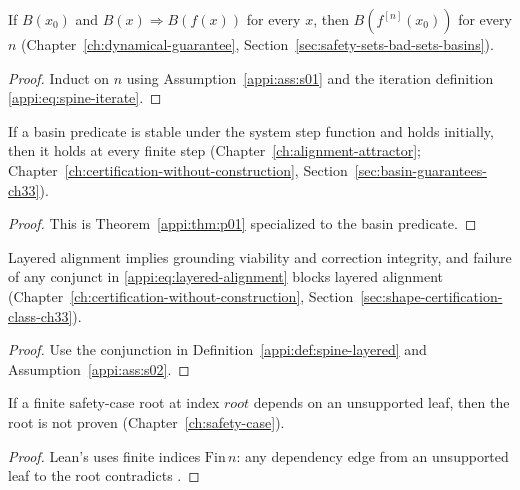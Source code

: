 \begin{theorem}
\label{appi:thm:p01}
If \(B(x_0)\) and \(B(x)\Rightarrow B(f(x))\) for every \(x\), then \(B(f^{[n]}(x_0))\) for every \(n\) (Chapter~\ref{ch:dynamical-guarantee}, Section~\ref{sec:safety-sets-bad-sets-basins}).
\end{theorem}
\begin{proof}
Induct on \(n\) using Assumption~\ref{appi:ass:s01} and the iteration definition \eqref{appi:eq:spine-iterate}.
\end{proof}

\begin{corollary}
\label{appi:cor:p35}
If a basin predicate is stable under the system step function and holds initially, then it holds at every finite step (Chapter~\ref{ch:alignment-attractor}; Chapter~\ref{ch:certification-without-construction}, Section~\ref{sec:basin-guarantees-ch33}).
\end{corollary}
\begin{proof}
This is Theorem~\ref{appi:thm:p01} specialized to the basin predicate.
\end{proof}

\begin{lemma}
\label{appi:lem:p02}
Layered alignment implies grounding viability and correction integrity, and failure of any conjunct in \eqref{appi:eq:layered-alignment} blocks layered alignment (Chapter~\ref{ch:certification-without-construction}, Section~\ref{sec:shape-certification-class-ch33}).
\end{lemma}
\begin{proof}
Use the conjunction in Definition~\ref{appi:def:spine-layered} and Assumption~\ref{appi:ass:s02}.
\end{proof}

\begin{lemma}
\label{appi:lem:p40}
If a finite safety-case root at index \(root\) depends on an unsupported leaf, then the root is not proven (Chapter~\ref{ch:safety-case}).
\end{lemma}
\begin{proof}
Lean's  uses finite indices \(\mathrm{Fin}\,n\): any dependency edge from an unsupported leaf to the root contradicts .
\end{proof}

